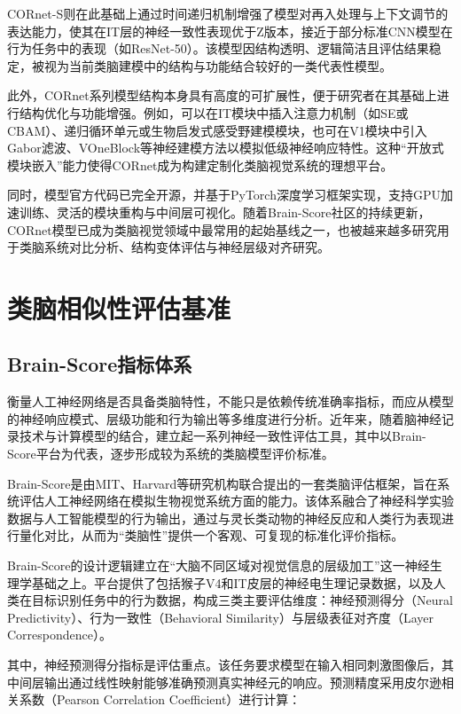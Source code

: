 CORnet-S则在此基础上通过时间递归机制增强了模型对再入处理与上下文调节的表达能力，使其在IT层的神经一致性表现优于Z版本，接近于部分标准CNN模型在行为任务中的表现（如ResNet-50）。该模型因结构透明、逻辑简洁且评估结果稳定，被视为当前类脑建模中的结构与功能结合较好的一类代表性模型。

此外，CORnet系列模型结构本身具有高度的可扩展性，便于研究者在其基础上进行结构优化与功能增强。例如，可以在IT模块中插入注意力机制（如SE或CBAM）、递归循环单元或生物启发式感受野建模模块，也可在V1模块中引入Gabor滤波、VOneBlock等神经建模方法以模拟低级神经响应特性。这种“开放式模块嵌入”能力使得CORnet成为构建定制化类脑视觉系统的理想平台。

同时，模型官方代码已完全开源，并基于PyTorch深度学习框架实现，支持GPU加速训练、灵活的模块重构与中间层可视化。随着Brain-Score社区的持续更新，CORnet模型已成为类脑视觉领域中最常用的起始基线之一，也被越来越多研究用于类脑系统对比分析、结构变体评估与神经层级对齐研究。

\section{类脑相似性评估基准}

\subsection{Brain-Score指标体系}

衡量人工神经网络是否具备类脑特性，不能只是依赖传统准确率指标，而应从模型的神经响应模式、层级功能和行为输出等多维度进行分析。近年来，随着脑神经记录技术与计算模型的结合，建立起一系列神经一致性评估工具，其中以Brain-Score平台为代表，逐步形成较为系统的类脑模型评价标准。

Brain-Score是由MIT、Harvard等研究机构联合提出的一套类脑评估框架，旨在系统评估人工神经网络在模拟生物视觉系统方面的能力。该体系融合了神经科学实验数据与人工智能模型的行为输出，通过与灵长类动物的神经反应和人类行为表现进行量化对比，从而为“类脑性”提供一个客观、可复现的标准化评价指标\cite{schrimpf2018brain}。

Brain-Score的设计逻辑建立在“大脑不同区域对视觉信息的层级加工”这一神经生理学基础之上。平台提供了包括猴子V4和IT皮层的神经电生理记录数据，以及人类在目标识别任务中的行为数据，构成三类主要评估维度：神经预测得分（Neural Predictivity）、行为一致性（Behavioral Similarity）与层级表征对齐度（Layer Correspondence）。

其中，神经预测得分指标是评估重点。该任务要求模型在输入相同刺激图像后，其中间层输出通过线性映射能够准确预测真实神经元的响应。预测精度采用皮尔逊相关系数（Pearson Correlation Coefficient）进行计算：

